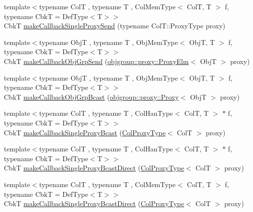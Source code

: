 \begin{DoxyCompactItemize}
\item 
{\footnotesize template$<$typename ColT , typename T , Col\+Mem\+Type$<$ Col\+T, T $>$ f, typename CbkT  = Def\+Type$<$\+T$>$$>$ }\\CbkT \hyperlink{structvt_1_1pipe_1_1_pipe_manager_t_l_a2c8c3a5aca22b2526fe68dd543a8a888}{make\+Callback\+Single\+Proxy\+Send} (typename Col\+T\+::\+Proxy\+Type proxy)
\item 
{\footnotesize template$<$typename ObjT , typename T , Obj\+Mem\+Type$<$ Obj\+T, T $>$ f, typename CbkT  = Def\+Type$<$\+T$>$$>$ }\\CbkT \hyperlink{structvt_1_1pipe_1_1_pipe_manager_t_l_a98f92fd3f75e48766b55c7b7253c19b4}{make\+Callback\+Obj\+Grp\+Send} (\hyperlink{structvt_1_1objgroup_1_1proxy_1_1_proxy_elm}{objgroup\+::proxy\+::\+Proxy\+Elm}$<$ ObjT $>$ proxy)
\item 
{\footnotesize template$<$typename ObjT , typename T , Obj\+Mem\+Type$<$ Obj\+T, T $>$ f, typename CbkT  = Def\+Type$<$\+T$>$$>$ }\\CbkT \hyperlink{structvt_1_1pipe_1_1_pipe_manager_t_l_a8a4da1e38acd018f847aa9fddae44956}{make\+Callback\+Obj\+Grp\+Bcast} (\hyperlink{structvt_1_1objgroup_1_1proxy_1_1_proxy}{objgroup\+::proxy\+::\+Proxy}$<$ ObjT $>$ proxy)
\item 
{\footnotesize template$<$typename ColT , typename T , Col\+Han\+Type$<$ Col\+T, T $>$ $\ast$ f, typename CbkT  = Def\+Type$<$\+T$>$$>$ }\\CbkT \hyperlink{structvt_1_1pipe_1_1_pipe_manager_t_l_a0f66ce82b544151cbdec67a13a6ead34}{make\+Callback\+Single\+Proxy\+Bcast} (\hyperlink{structvt_1_1pipe_1_1_pipe_manager_t_l_af56c58cad882496e35f01227d4da3898}{Col\+Proxy\+Type}$<$ ColT $>$ proxy)
\item 
{\footnotesize template$<$typename ColT , typename T , Col\+Han\+Type$<$ Col\+T, T $>$ $\ast$ f, typename CbkT  = Def\+Type$<$\+T$>$$>$ }\\CbkT \hyperlink{structvt_1_1pipe_1_1_pipe_manager_t_l_aff70024da9ee15ef2c935ca21d18a80d}{make\+Callback\+Single\+Proxy\+Bcast\+Direct} (\hyperlink{structvt_1_1pipe_1_1_pipe_manager_t_l_af56c58cad882496e35f01227d4da3898}{Col\+Proxy\+Type}$<$ ColT $>$ proxy)
\item 
{\footnotesize template$<$typename ColT , typename T , Col\+Mem\+Type$<$ Col\+T, T $>$ f, typename CbkT  = Def\+Type$<$\+T$>$$>$ }\\CbkT \hyperlink{structvt_1_1pipe_1_1_pipe_manager_t_l_aff70024da9ee15ef2c935ca21d18a80d}{make\+Callback\+Single\+Proxy\+Bcast\+Direct} (\hyperlink{structvt_1_1pipe_1_1_pipe_manager_t_l_af56c58cad882496e35f01227d4da3898}{Col\+Proxy\+Type}$<$ ColT $>$ proxy)

\end{DoxyCompactItemize}

